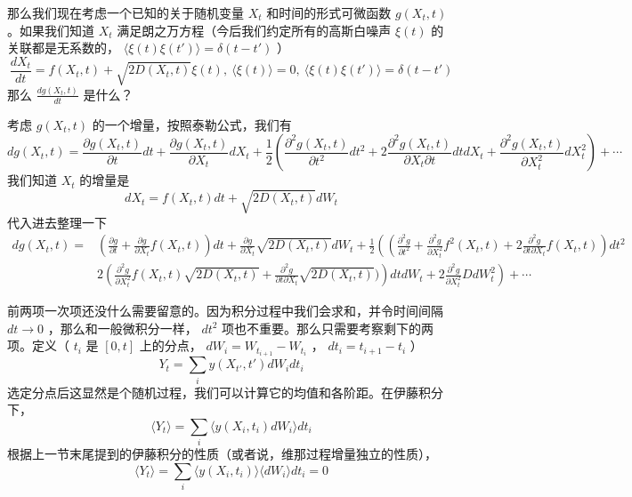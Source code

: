 \documentclass{ctexart}
\newcommand\non{\nonumber \\}
\begin{document}
那么我们现在考虑一个已知的关于随机变量 $X_t$ 和时间的形式可微函数 $g(X_t,t)$ 。如果我们知道 $X_t$ 满足朗之万方程（今后我们约定所有的高斯白噪声 $\xi(t)$ 的关联都是无系数的， $\langle\xi(t)\xi(t')\rangle=\delta(t-t')$ ）
\begin{equation}
\frac{dX_t}{dt}=f(X_t,t)+\sqrt{2D(X_t,t)}\xi(t),\ \langle\xi(t)\rangle=0,\ \langle\xi(t)\xi(t')\rangle=\delta(t-t')
\end{equation}
那么 $\frac{dg(X_t,t)}{dt}$ 是什么？

考虑 $g(X_t,t)$ 的一个增量，按照泰勒公式，我们有
\begin{equation}
dg(X_t,t)=\frac{\partial g(X_t,t)}{\partial t}dt+\frac{\partial g(X_t,t)}{\partial X_t}dX_t+\frac{1}{2}\left(\frac{\partial^2 g(X_t,t)}{\partial t^2}dt^2+2\frac{\partial^2 g(X_t,t)}{\partial X_t\partial t}dtdX_t+\frac{\partial^2 g(X_t,t)}{\partial X_t^2}dX_t^2\right)+\cdots
\end{equation}
我们知道 $X_t$ 的增量是
\begin{equation}
dX_t=f(X_t,t)dt+\sqrt{2D(X_t,t)}dW_t
\end{equation}
代入进去整理一下 
\begin{align} 
dg(X_t,t)=&\left(\frac{\partial g}{\partial t}+\frac{\partial g}{\partial X_t}f(X_t,t)\right)dt+\frac{\partial g}{\partial X_t}\sqrt{2D(X_t,t)}dW_t+\frac{1}{2}\left(\left(\frac{\partial^2 g}{\partial t^2}+\frac{\partial^2 g}{\partial X_t^2}f^2(X_t,t)+2\frac{\partial^2 g}{\partial t\partial X_t}f(X_t,t)\right)dt^2\right. \non
 & \left.2\left(\frac{\partial^2 g}{\partial X_t^2}f(X_t,t)\sqrt{2D(X_t,t)}+\frac{\partial^2 g}{\partial t\partial X_t}\sqrt{2D(X_t,t)})\right)dtdW_t+2\frac{\partial^2 g}{\partial X_t^2}D dW_t^2\right)+\cdots 
\end{align}

前两项一次项还没什么需要留意的。因为积分过程中我们会求和，并令时间间隔 $dt\to0$ ，那么和一般微积分一样， $dt^2$ 项也不重要。那么只需要考察剩下的两项。定义（ $t_i$ 是 $[0,t]$ 上的分点， $dW_i=W_{t_{i+1}}-W_{t_i}$ ， $dt_i=t_{i+1}-t_i$ ）
\begin{equation}
Y_t=\sum_i y(X_{t'},t')dW_idt_i
\end{equation}
选定分点后这显然是个随机过程，我们可以计算它的均值和各阶距。在伊藤积分下，
\begin{equation}
\langle Y_t\rangle=\sum_i\langle y(X_i,t_i)dW_i\rangle dt_i
\end{equation}
根据上一节末尾提到的伊藤积分的性质（或者说，维那过程增量独立的性质），
\begin{equation}
\langle Y_t\rangle=\sum_i\langle y(X_i,t_i)\rangle\langle dW_i\rangle dt_i=0
\end{equation}
\end{document}
